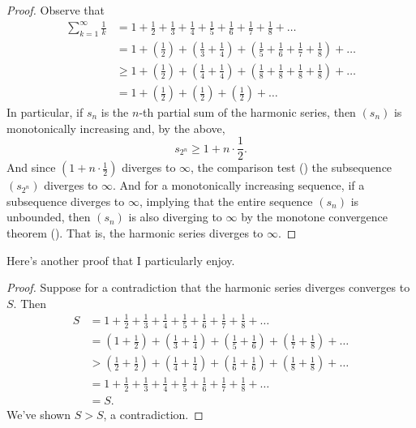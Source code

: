 \begin{proof}
  Observe that
  \begin{align*}
    \sum_{k = 1}^{\infty} \frac{1}{k} & = 1 + \frac{1}{2} +
    \frac{1}{3} + \frac{1}{4} + \frac{1}{5} + \frac{1}{6} +
    \frac{1}{7} + \frac{1}{8} + \dots \\
    & = 1 + \left(\frac{1}{2}\right) + \left(\frac{1}{3} + \frac{1}{4}\right) +
    \left(\frac{1}{5} + \frac{1}{6} + \frac{1}{7} +
    \frac{1}{8}\right) + \dots \\
    & \geq 1 + \left(\frac{1}{2}\right) + \left(\frac{1}{4} +
    \frac{1}{4}\right) +
    \left(\frac{1}{8} + \frac{1}{8} + \frac{1}{8} +
    \frac{1}{8}\right) + \dots \\
    & = 1 + \left(\frac{1}{2}\right) + \left(\frac{1}{2}\right) +
    \left(\frac{1}{2}\right) + \dots
  \end{align*}
  In particular, if $s_n$ is the $n$-th partial sum of the harmonic
  series, then $(s_n)$ is monotonically increasing and, by the above,
  \[ s_{2^n} \geq 1 + n \cdot \frac{1}{2}. \]
  And since $(1 + n \cdot \frac{1}{2})$ diverges to $\infty$, the
  comparison test () the subsequence
  $(s_{2^n})$ diverges to $\infty$. And for a monotonically
  increasing sequence, if a subsequence diverges to $\infty$,
  implying that the entire sequence $(s_n)$ is unbounded, then
  $(s_n)$ is also diverging to $\infty$ by the monotone convergence
  theorem (). That is, the harmonic
  series diverges to $\infty$.
\end{proof}

Here's another proof that I particularly enjoy.

\begin{proof}
  Suppose for a contradiction that the harmonic series diverges
  converges to $S$. Then
  \begin{align*}
    S & = 1 + \frac{1}{2} + \frac{1}{3} + \frac{1}{4} + \frac{1}{5} +
    \frac{1}{6} + \frac{1}{7} + \frac{1}{8} + \dots \\
    & = \left(1 + \frac{1}{2}\right) + \left(\frac{1}{3} + \frac{1}{4}\right) +
    \left(\frac{1}{5} + \frac{1}{6}\right) + \left(\frac{1}{7} +
    \frac{1}{8}\right) + \dots \\
    & > \left(\frac{1}{2} + \frac{1}{2}\right) + \left(\frac{1}{4} +
    \frac{1}{4}\right) +
    \left(\frac{1}{6} + \frac{1}{6}\right) + \left(\frac{1}{8} +
    \frac{1}{8}\right) + \dots \\
    & = 1 + \frac{1}{2} + \frac{1}{3} + \frac{1}{4} + \frac{1}{5} +
    \frac{1}{6} + \frac{1}{7} + \frac{1}{8} + \dots \\
    & = S.
  \end{align*}
  We've shown $S > S$, a contradiction.
\end{proof}

